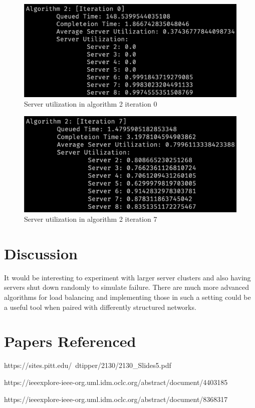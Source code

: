 \documentclass[12pt]{article}
\begin{document}
	\begin{figure}[h]
		\centering
		\includegraphics[width=\textwidth]{iter0}
		\caption{Server utilization in algorithm 2 iteration 0}
	\end{figure}

	\begin{figure}[h]
		\centering
		\includegraphics[width=\textwidth]{iter7}
		\caption{Server utilization in algorithm 2 iteration 7}
	\end{figure}

\section{Discussion}
	\par It would be interesting to experiment with larger server clusters and also having servers shut down randomly to simulate failure. There are much more advanced algorithms for load balancing and implementing those in such a setting could be a useful tool when paired with differently structured networks. 

\section{Papers Referenced}
	\begin{description}
		\item https://sites.pitt.edu/~dtipper/2130/2130\_Slides5.pdf
		\item https://ieeexplore-ieee-org.uml.idm.oclc.org/abstract/document/4403185
		\item https://ieeexplore-ieee-org.uml.idm.oclc.org/abstract/document/8368317
	\end{description}
\end{document}
